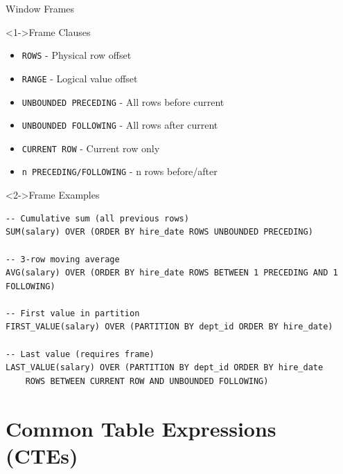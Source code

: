 \documentclass[aspectratio=169,11pt]{beamer}
\begin{document}
\begin{frame}[fragile]{Window Frames}
\begin{block}<1->{Frame Clauses}
\begin{itemize}
    \item \texttt{ROWS} - Physical row offset
    \item \texttt{RANGE} - Logical value offset
    \item \texttt{UNBOUNDED PRECEDING} - All rows before current
    \item \texttt{UNBOUNDED FOLLOWING} - All rows after current
    \item \texttt{CURRENT ROW} - Current row only
    \item \texttt{n PRECEDING/FOLLOWING} - n rows before/after
\end{itemize}
\end{block}

\pause
\begin{exampleblock}<2->{Frame Examples}
\begin{lstlisting}
-- Cumulative sum (all previous rows)
SUM(salary) OVER (ORDER BY hire_date ROWS UNBOUNDED PRECEDING)

-- 3-row moving average
AVG(salary) OVER (ORDER BY hire_date ROWS BETWEEN 1 PRECEDING AND 1 FOLLOWING)

-- First value in partition
FIRST_VALUE(salary) OVER (PARTITION BY dept_id ORDER BY hire_date)

-- Last value (requires frame)
LAST_VALUE(salary) OVER (PARTITION BY dept_id ORDER BY hire_date
    ROWS BETWEEN CURRENT ROW AND UNBOUNDED FOLLOWING)
\end{lstlisting}
\end{exampleblock}
\end{frame}

\section{Common Table Expressions (CTEs)}
\end{document}
